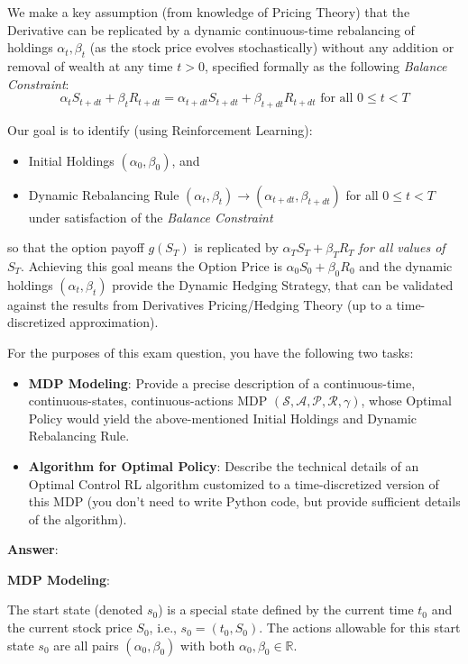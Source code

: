 \documentclass[12pt]{exam}
\begin{document}
\begin{questions}
We make a key assumption (from knowledge of Pricing Theory) that the Derivative can be replicated by a dynamic continuous-time rebalancing of holdings $\alpha_t, \beta_t$ (as the stock price evolves stochastically) without any addition or removal of wealth at any time $t > 0$, specified formally as the following {\em Balance Constraint}: 
$$\alpha_t S_{t+dt} + \beta_t R_{t+dt} = \alpha_{t+dt} S_{t+dt} + \beta_{t+dt} R_{t+dt} \mbox{ for all } 0 \leq t < T$$

Our goal is to identify (using Reinforcement Learning):
\begin{itemize}
\item  Initial Holdings $(\alpha_0, \beta_0)$, and
\item Dynamic Rebalancing Rule $(\alpha_t, \beta_t) \rightarrow (\alpha_{t+dt}, \beta_{t+dt})$ for all
$0 \leq t < T$ under satisfaction of the {\em Balance Constraint}
\end{itemize}
so that the option payoff $g(S_T)$ is replicated by $\alpha_T S_T + \beta_T R_T$ {\em for all values of $S_T$}. Achieving this goal means the Option Price is $\alpha_0 S_0 + \beta_0 R_0$ and the dynamic holdings $(\alpha_t, \beta_t)$ provide the Dynamic Hedging Strategy, that can be validated against the results from Derivatives Pricing/Hedging Theory (up to a time-discretized approximation).

For the purposes of this exam question, you have the following two tasks:

\begin{itemize}
\item {\bf MDP Modeling}: Provide a precise description of a continuous-time, continuous-states, continuous-actions MDP $(\mathcal{S}, \mathcal{A}, \mathcal{P}, \mathcal{R}, \gamma)$, whose Optimal Policy would yield the above-mentioned Initial Holdings and Dynamic Rebalancing Rule.
\item {\bf Algorithm for Optimal Policy}:  Describe the technical details of an Optimal Control RL algorithm customized to a time-discretized version of this MDP (you don't need to write Python code, but provide sufficient details of the algorithm).
\end{itemize}

{\bf Answer}:

{\bf MDP Modeling}: 

The start state (denoted $s_0$) is a special state defined by the current time $t_0$ and the current stock price $S_0$, i.e., $s_0 = (t_0, S_0)$. The actions allowable for this start state $s_0$ are all pairs $(\alpha_0, \beta_0)$ with both $\alpha_0, \beta_0 \in \mathbb{R}$.


\end{questions}
\end{document}
